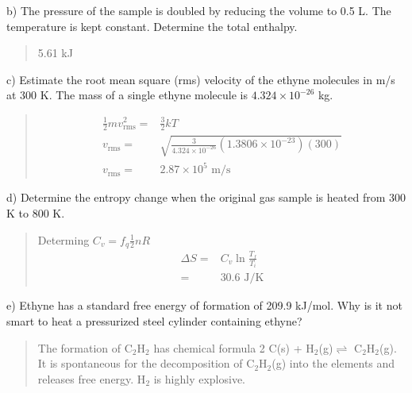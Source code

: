 \documentclass[11pt]{article}
\newcommand{\brian}[1]{
  {\begin{quote}
      \color{blue} #1
  \end{quote}}
}
\begin{document}
b) The pressure of the sample is doubled by reducing the volume to 0.5 L. The
temperature is kept constant. Determine the total enthalpy.

\brian{5.61 kJ}

c) Estimate the root mean square (rms) velocity of the ethyne molecules in m/s at 300 K.
The mass of a single ethyne molecule is $4.324\times 10^{-26}$ kg.

\brian{
  \begin{align*}
    \frac{1}{2}mv^2_\text{rms} = & \frac{3}{2}kT \\
    v_\text{rms} = & \sqrt{\frac{3}{4.324\times 10^{-26}}(1.3806\times 10^{-23})(300)} \\
    v_\text{rms} = & 2.87\times 10^5 \text{ m/s}
  \end{align*}
}

d) Determine the entropy change when the original gas sample is heated from 300 K to
800 K.

\brian{Determing $C_v = f_q\frac{1}{2}nR$
  \begin{align*}
    \Delta S = & C_v\ln\frac{T_f}{T_i} \\
    = & 30.6 \text{ J/K}
  \end{align*}
}

e) Ethyne has a standard free energy of formation of 209.9 kJ/mol. Why is it not smart
to heat a pressurized steel cylinder containing ethyne?

\brian{The formation of C$_2$H$_2$ has chemical formula 2 C(s) + H$_2$(g)$\rightleftharpoons$ C$_2$H$_2$(g).
  It is spontaneous for the decomposition of C$_2$H$_2$(g) into the elements and releases free energy.
  H$_2$ is highly explosive.
}
\end{document}
